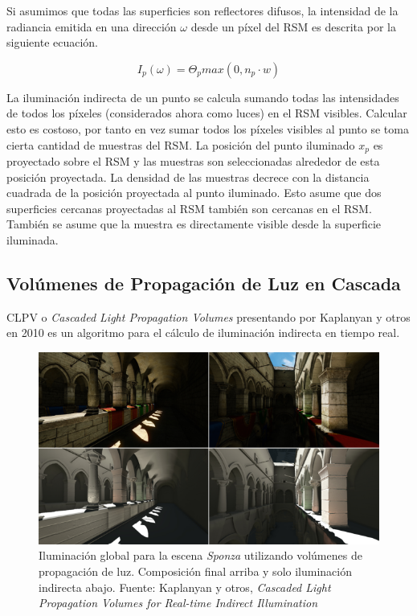 Si asumimos que todas las superficies son reflectores difusos, la intensidad de la radiancia emitida en una dirección $\omega$ desde un píxel del \ac{RSM} es descrita por la siguiente ecuación.

\begin{equation}
    I_{p}(\omega) = \Theta_{p}max(0, n_{p} \cdot {w})
    \label{eq:rsm_radiance}
\end{equation}

La iluminación indirecta de un punto se calcula sumando todas las intensidades de todos los píxeles (considerados ahora como luces) en el \ac{RSM} visibles. Calcular esto es costoso, por tanto en vez sumar todos los píxeles visibles al punto se toma cierta cantidad de muestras del \ac{RSM}. La posición del punto iluminado $x_{p}$ es proyectado sobre el \ac{RSM} y las muestras son seleccionadas alrededor de esta posición proyectada. La densidad de las muestras decrece con la distancia cuadrada de la posición proyectada al punto iluminado. Esto asume que dos superficies cercanas proyectadas al \ac{RSM} también son cercanas en el \ac{RSM}. También se asume que la muestra es directamente visible desde la superficie iluminada.

\subsection{Volúmenes de Propagación de Luz en Cascada}
\Ac{CLPV} o \emph{Cascaded Light Propagation Volumes} presentando por Kaplanyan y otros en 2010 \cite{Kaplanyan:2010} es un algoritmo para el cálculo de iluminación indirecta en tiempo real.

\begin{figure}[H]
	\centering
	\includegraphics[width=0.85\linewidth]{media/lpvresult.png}
	\caption{Iluminación global para la escena \emph{Sponza} utilizando volúmenes de propagación de luz. Composición final arriba y solo iluminación indirecta abajo. Fuente: Kaplanyan y otros, \emph{Cascaded Light Propagation Volumes for Real-time Indirect Illumination} \cite{Kaplanyan:2010}}
	\label{fig:lvp_results}
\end{figure}

